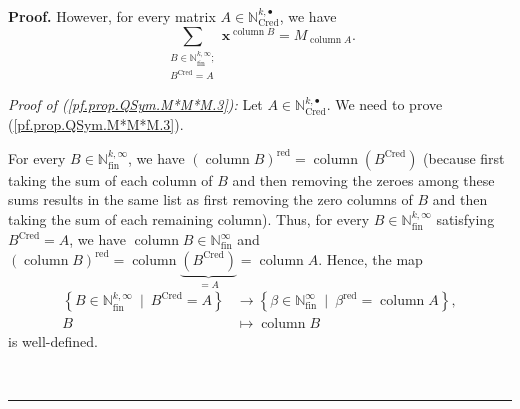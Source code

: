 \documentclass[numbers=enddot,12pt,final,onecolumn,notitlepage,abstracton]{scrartcl}%
\theoremstyle{definition}
\newenvironment{proof}[1][Proof]{\noindent\textbf{#1.} }{\ \rule{0.5em}{0.5em}}
\let\sumnonlimits\sum
\renewcommand{\sum}{\sumnonlimits\limits}
\begin{document}
\begin{proof}
However, for every matrix $A\in\mathbb{N}_{\operatorname*{Cred}}^{k,\bullet}$,
we have%
\begin{equation}
\sum_{\substack{B\in\mathbb{N}_{\operatorname*{fin}}^{k,\infty}%
;\\B^{\operatorname*{Cred}}=A}}\mathbf{x}^{\operatorname*{column}%
B}=M_{\operatorname*{column}A}. \label{pf.prop.QSym.M*M*M.3}%
\end{equation}


\textit{Proof of (\ref{pf.prop.QSym.M*M*M.3}):} Let $A\in\mathbb{N}%
_{\operatorname*{Cred}}^{k,\bullet}$. We need to prove
(\ref{pf.prop.QSym.M*M*M.3}).

For every $B\in\mathbb{N}_{\operatorname*{fin}}^{k,\infty}$, we have $\left(
\operatorname*{column}B\right)  ^{\operatorname*{red}}=\operatorname*{column}%
\left(  B^{\operatorname*{Cred}}\right)  $ (because first taking the sum of
each column of $B$ and then removing the zeroes among these sums results in
the same list as first removing the zero columns of $B$ and then taking the
sum of each remaining column). Thus, for every $B\in\mathbb{N}%
_{\operatorname*{fin}}^{k,\infty}$ satisfying $B^{\operatorname*{Cred}}=A$, we
have $\operatorname*{column}B\in\mathbb{N}_{\operatorname*{fin}}^{\infty}$ and
$\left(  \operatorname*{column}B\right)  ^{\operatorname*{red}}%
=\operatorname*{column}\underbrace{\left(  B^{\operatorname*{Cred}}\right)
}_{=A}=\operatorname*{column}A$. Hence, the map%
\begin{align}
\left\{  B\in\mathbb{N}_{\operatorname*{fin}}^{k,\infty}\ \mid
\ B^{\operatorname*{Cred}}=A\right\}   &  \rightarrow\left\{  \beta
\in\mathbb{N}_{\operatorname*{fin}}^{\infty}\ \mid\ \beta^{\operatorname*{red}%
}=\operatorname*{column}A\right\}  ,\nonumber\\
B  &  \mapsto\operatorname*{column}B \label{pf.prop.QSym.M*M*M.3.pf.1}%
\end{align}
is well-defined.


\end{proof}
\end{document}
